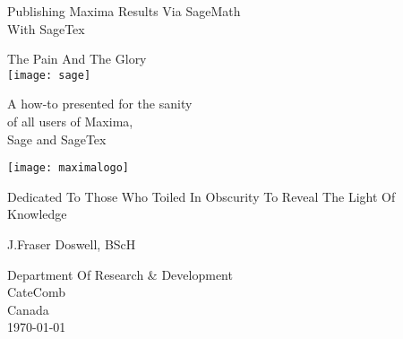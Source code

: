 % 
% 
\begin{titlepage}
   \begin{center}
  		
       \vspace{0.25cm}

       	\Large{Publishing Maxima Results}
		\Large{Via SageMath} \\
		\Large{With SageTex}

       \vspace{0.5cm}
        \large{The Pain And The Glory}\\
        
       \vspace{0.5cm}
       \texttt{[image: sage]}
	   \vspace{0.5cm}              

		A how-to presented for the sanity\\
		of all users of Maxima,\\
		Sage and SageTex\\
    
		\vspace{0.5cm}
		
		\texttt{[image: maximalogo]}
		\vspace{0.5cm}              
		
    	\large{Dedicated To Those Who Toiled In Obscurity To Reveal The Light Of Knowledge}
       
		\vspace{0.5cm}              
       
       \large{J.Fraser Doswell, BScH}

            
       \vspace{0.5cm}
     

            
        Department Of Research \& Development\\
        CateComb \\
        Canada \\
        \today
            
   \end{center}
\end{titlepage}